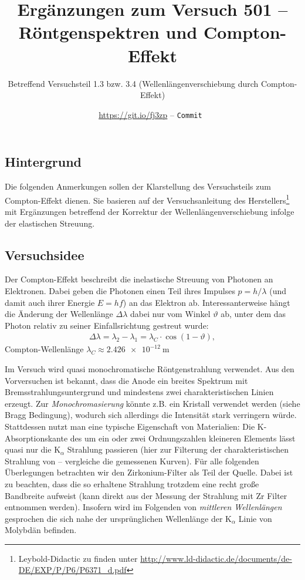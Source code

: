 \documentclass[ngerman,a4paper,twocolumn,twoside]{scrartcl}
\title{Ergänzungen zum Versuch 501 -- Röntgenspektren und Compton-Effekt}
\subtitle{Betreffend Versuchsteil 1.3 bzw. 3.4 (Wellenlängenverschiebung durch Compton-Effekt)}
\author{\url{https://git.io/fj3zp} -- \texttt{Commit }}
\begin{document}
\maketitle
\subsection*{Hintergrund}
Die folgenden Anmerkungen sollen der Klarstellung des Versuchsteils zum Compton-Effekt dienen. Sie basieren auf der Versuchsanleitung des Herstellers\footnote{Leybold-Didactic zu finden unter \url{http://www.ld-didactic.de/documents/de-DE/EXP/P/P6/P6371_d.pdf}} mit Ergänzungen betreffend der Korrektur der Wellenlängenverschiebung infolge der elastischen Streuung.
\subsection*{Versuchsidee}
Der Compton-Effekt beschreibt die inelastische Streuung von Photonen an Elektronen. Dabei geben die Photonen einen Teil ihres Impulses $p=h/\lambda$ (und damit auch ihrer Energie $E=hf$) an das Elektron ab. Interessanterweise hängt die Änderung der Wellenlänge $\Delta\lambda$ dabei nur vom Winkel $\vartheta$ ab, unter dem das Photon relativ zu seiner Einfallsrichtung gestreut wurde:
\begin{align}
\Delta\lambda=\lambda_2-\lambda_1=\lambda_C \cdot \cos(1-\vartheta), \label{eq:compton}
\end{align}
Compton-Wellenlänge $\lambda_C\approx\SI{2.426e-12}{\m}$
\par
Im Versuch wird quasi monochromatische Röntgenstrahlung verwendet. Aus den Vorversuchen ist bekannt, dass die Anode ein breites Spektrum mit Bremsstrahlungsuntergrund und mindestens zwei charakteristischen Linien erzeugt. Zur \emph{Monochromasierung} könnte z.B. ein Kristall verwendet werden (siehe Bragg Bedingung), wodurch sich allerdings die Intensität stark verringern würde. Stattdessen nutzt man eine typische Eigenschaft von Materialien: Die K-Absorptionskante des um ein oder zwei Ordnungszahlen kleineren Elements lässt quasi nur die $\mathrm{K}_\alpha$ Strahlung passieren (hier  zur Filterung der charakteristischen Strahlung von   -- vergleiche die gemessenen Kurven). Für alle folgenden Überlegungen betrachten wir den Zirkonium-Filter als Teil der Quelle. Dabei ist zu beachten, dass die so erhaltene Strahlung trotzdem eine recht große Bandbreite aufweist (kann direkt aus der Messung der Strahlung mit Zr Filter entnommen werden). Insofern wird im Folgenden von \emph{mittleren Wellenlängen} gesprochen die sich nahe der ursprünglichen Wellenlänge der $\mathrm{K}_\alpha$ Linie von Molybdän befinden.
\end{document}
